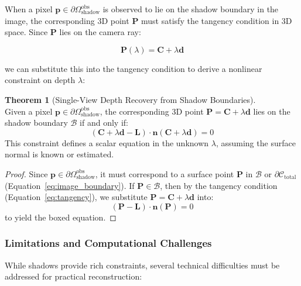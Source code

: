 \documentclass[12pt]{article}
\newcommand{\vect}[1]{\bm{#1}}
\theoremstyle{definition}
\newtheorem{theorem}{Theorem}[subsection]
\begin{document}
When a pixel $\vect{p} \in \partial\Omega_{\text{shadow}}^{\text{obs}}$ is observed to lie on the shadow boundary in the image, the corresponding 3D point $\vect{P}$ must satisfy the tangency condition in 3D space. Since $\vect{P}$ lies on the camera ray:

\[
\vect{P}(\lambda) = \vect{C} + \lambda \vect{d}
\]

we can substitute this into the tangency condition to derive a nonlinear constraint on depth $\lambda$:

\begin{theorem}[Single-View Depth Recovery from Shadow Boundaries] ~\\
Given a pixel $\vect{p} \in \partial\Omega_{\text{shadow}}^{\text{obs}}$, the corresponding 3D point $\vect{P} = \vect{C} + \lambda \vect{d}$ lies on the shadow boundary $\mathcal{B}$ if and only if:
\[
\boxed{(\vect{C} + \lambda \vect{d} - \vect{L}) \cdot \vect{n}(\vect{C} + \lambda \vect{d}) = 0}
\]
This constraint defines a scalar equation in the unknown $\lambda$, assuming the surface normal is known or estimated.
\end{theorem}

\begin{proof}
Since $\vect{p} \in \partial\Omega_{\text{shadow}}^{\text{obs}}$, it must correspond to a surface point $\vect{P}$ in $\mathcal{B}$ or $\partial\mathcal{C}_{\text{total}}$ (Equation~\eqref{eq:image_boundary}). If $\vect{P} \in \mathcal{B}$, then by the tangency condition (Equation~\eqref{eq:tangency}), we substitute $\vect{P} = \vect{C} + \lambda \vect{d}$ into:
\[
(\vect{P} - \vect{L}) \cdot \vect{n}(\vect{P}) = 0
\]
to yield the boxed equation.
\end{proof}

\subsubsection*{Limitations and Computational Challenges}

While shadows provide rich constraints, several technical difficulties must be addressed for practical reconstruction:
\end{document}
